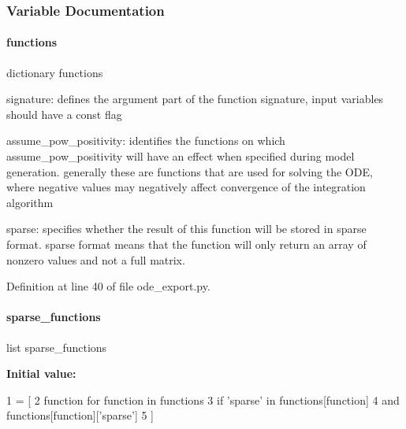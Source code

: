 \subsubsection{Variable Documentation}
\mbox{\label{namespaceamici_1_1ode__export_ac310aa598d85b31cc0acea80dcc3c083}} 
\paragraph{\texorpdfstring{functions}{functions}}
{\footnotesize\ttfamily dictionary functions}

signature\+: defines the argument part of the function signature, input variables should have a const flag

assume\+\_\+pow\+\_\+positivity\+: identifies the functions on which assume\+\_\+pow\+\_\+positivity will have an effect when specified during model generation. generally these are functions that are used for solving the O\+DE, where negative values may negatively affect convergence of the integration algorithm

sparse\+: specifies whether the result of this function will be stored in sparse format. sparse format means that the function will only return an array of nonzero values and not a full matrix. 

Definition at line 40 of file ode\+\_\+export.\+py.

\mbox{\label{namespaceamici_1_1ode__export_aa54a407fede674f20bf6ba67fe27177d}} 
\paragraph{\texorpdfstring{sparse\+\_\+functions}{sparse\_functions}}
{\footnotesize\ttfamily list sparse\+\_\+functions}

{\bfseries Initial value\+:}
\begin{DoxyCode}
1 =  [
2     function \textcolor{keywordflow}{for} function \textcolor{keywordflow}{in} functions
3     \textcolor{keywordflow}{if} \textcolor{stringliteral}{'sparse'} \textcolor{keywordflow}{in} functions[function]
4     \textcolor{keywordflow}{and} functions[function][\textcolor{stringliteral}{'sparse'}]
5 ]
\end{DoxyCode}


